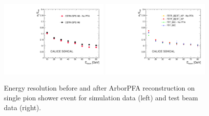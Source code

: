 \documentclass[cits]{JINST}
\begin{document}
\begin{figure}[!h]
  \begin{center}
    \includegraphics[width=0.48\textwidth]{plots/SingleParticle/CALICESDHCAL/DATA_ONLY/Single_DATA_ONLY_EResol.pdf}
    \includegraphics[width=0.48\textwidth]{plots/SingleParticle/CALICESDHCAL/MC_ONLY/Single_MC_ONLY_EResol.pdf} \\
  \end{center}
  \caption{\label{ARBOR_SINGLE_PARTICLE_ERESOL_DATA_MC} Energy resolution before and after ArborPFA reconstruction on single pion shower event for simulation data (left) and test beam data (right).}
\end{figure}
\end{document}
